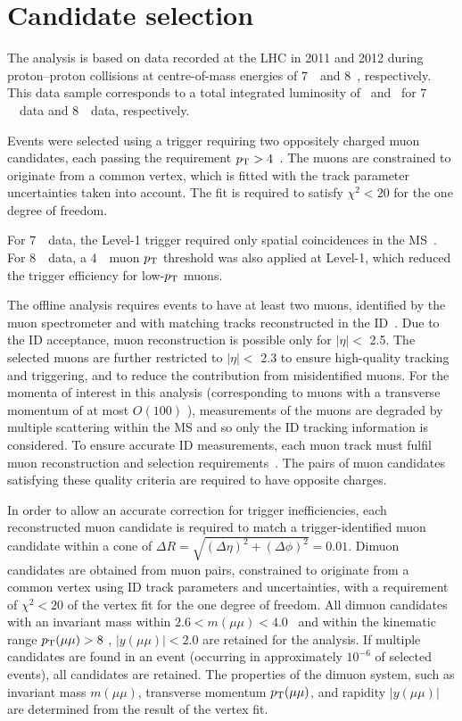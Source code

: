 \section{Candidate selection}
\label{sec:data}

The analysis is based on data recorded at the LHC in 2011 and 2012 during proton--proton collisions at centre-of-mass energies of $7$~\TeV\ and $8$~\TeV, respectively.
This data sample corresponds to a total integrated luminosity of \lumiA\ and \lumiB\ for  $7$~\TeV\ data and $8$~\TeV\ data, respectively.

Events were selected  using a trigger requiring two oppositely charged muon candidates, each passing the requirement $\mbox{$p_{\text{T}}$}>4$~\GeV. 
The muons are constrained to originate from a common vertex, which is fitted with the track parameter uncertainties taken into account. 
The fit is required to satisfy $\chi^2 < 20$ for the one degree of freedom.

For $7$~\TeV\ data, the Level-1 trigger required only spatial coincidences in the MS~\cite{ATLAS:2010kba}. For $8$~\TeV\ data, a $4$~\GeV\ muon $\mbox{$p_{\text{T}}$}$ threshold was also applied at Level-1, which reduced the trigger efficiency for low-$\mbox{$p_{\text{T}}$}$ muons.

The offline analysis requires events to have at least two muons, identified by the muon spectrometer and with matching tracks reconstructed in the ID~\cite{muons}.
Due to the ID acceptance, muon reconstruction is possible only for $|\eta| <$ 2.5. 
The selected muons are further restricted to $|\eta| <$ 2.3 to ensure high-quality tracking and triggering, and to reduce the contribution from misidentified muons.
For the momenta of interest in this analysis (corresponding to muons with a transverse momentum of at most $O(100)$ \GeV), measurements of the
muons are degraded by multiple scattering within the MS and so only the ID tracking
information is considered. 
To ensure accurate ID measurements, each muon track must fulfil muon reconstruction and selection requirements~\cite{muons}.
The pairs of muon candidates satisfying these quality criteria are required to have opposite charges.

In order to allow an accurate correction for trigger inefficiencies, each reconstructed muon candidate is required to match a trigger-identified muon
candidate within a cone of $\Delta R = \sqrt{(\Delta\eta)^2 + (\Delta\phi)^2}=0.01$.
Dimuon candidates are obtained from muon pairs, constrained to originate from a common vertex using ID track parameters and uncertainties, with a 
requirement of $\chi^2 < 20$ of the vertex fit for the one degree of freedom.
All dimuon candidates with an invariant mass
within $2.6 < m(\mu\mu) < 4.0$ \GeV\ and within the kinematic range $\mbox{$p_{\text{T}}$}(\mu\mu) > 8$ \GeV, $|y(\mu\mu)| < 2.0$ are retained for the analysis.
If multiple candidates are found in an event (occurring in approximately $10^{-6}$ of selected events), all candidates are retained.
The properties of the dimuon system, such as invariant mass $m(\mu\mu)$, transverse momentum $\mbox{$p_{\text{T}}$}(\mu\mu)$, and rapidity $|y(\mu\mu)|$ are determined from the result of the vertex fit.


